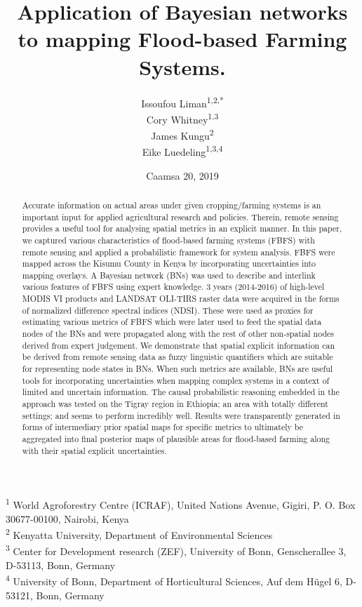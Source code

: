 \documentclass[12pt,oneside]{article}
\title{Application of Bayesian networks to mapping Flood-based Farming Systems.}
\author{Issoufou Liman\textsuperscript{1,2,*} \\ Cory Whitney\textsuperscript{1,3} \\ James Kungu\textsuperscript{2} \\ Eike Luedeling\textsuperscript{1,3,4}}
\date{Caamsa 20, 2019}
\begin{document}
\maketitle
\begin{abstract}
Accurate information on actual areas under given cropping/farming
systems is an important input for applied agricultural research and
policies. Therein, remote sensing provides a useful tool for analysing
spatial metrics in an explicit manner. In this paper, we captured
various characteristics of flood-based farming systems (FBFS) with
remote sensing and applied a probabilistic framework for system
analysis. FBFS were mapped across the Kisumu County in Kenya by
incorporating uncertainties into mapping overlays. A Bayesian network
(BNs) was used to describe and interlink various features of FBFS using
expert knowledge. 3 years (2014-2016) of high-level MODIS VI products
and LANDSAT OLI-TIRS raster data were acquired in the forms of
normalized difference spectral indices (NDSI). These were used as
proxies for estimating various metrics of FBFS which were later used to
feed the spatial data nodes of the BNs and were propagated along with
the rest of other non-spatial nodes derived from expert judgement. We
demonstrate that spatial explicit information can be derived from remote
sensing data as fuzzy linguistic quantifiers which are suitable for
representing node states in BNs. When such metrics are available, BNs
are useful tools for incorporating uncertainties when mapping complex
systems in a context of limited and uncertain information. The causal
probabilistic reasoning embedded in the approach was tested on the
Tigray region in Ethiopia; an area with totally different settings; and
seems to perform incredibly well. Results were transparently generated
in forms of intermediary prior spatial maps for specific metrics to
ultimately be aggregated into final posterior maps of plausible areas
for flood-based farming along with their spatial explicit uncertainties.
\end{abstract}

{
\hypersetup{linkcolor=black}
\setcounter{tocdepth}{5}
\tableofcontents
}
\textsuperscript{1} World Agroforestry Centre (ICRAF), United Nations
Avenue, Gigiri, P. O. Box 30677-00100, Nairobi, Kenya\\
\textsuperscript{2} Kenyatta University, Department of Environmental
Sciences\\
\textsuperscript{3} Center for Development research (ZEF), University of
Bonn, Genscherallee 3, D-53113, Bonn, Germany\\
\textsuperscript{4} University of Bonn, Department of Horticultural
Sciences, Auf dem Hügel 6, D-53121, Bonn, Germany
\end{document}
